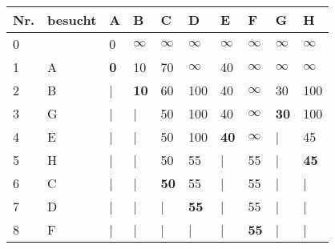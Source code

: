 \documentclass{bschlangaul-aufgabe}
\begin{document}
\begin{enumerate}
\begin{bAntwort}
\begin{tabular}{llllllllll}
\bf{Nr.}     & \bf{besucht} & \bf{A}       & \bf{B}       & \bf{C}       & \bf{D}       & \bf{E}       & \bf{F}       & \bf{G}       & \bf{H}       \\
\hline
0            &              & 0            & $\infty$     & $\infty$     & $\infty$     & $\infty$     & $\infty$     & $\infty$     & $\infty$     \\
1            & A            & \bf{0}       & 10           & 70           & $\infty$     & 40           & $\infty$     & $\infty$     & $\infty$     \\
2            & B            & |            & \bf{10}      & 60           & 100          & 40           & $\infty$     & 30           & 100          \\
3            & G            & |            & |            & 50           & 100          & 40           & $\infty$     & \bf{30}      & 100          \\
4            & E            & |            & |            & 50           & 100          & \bf{40}      & $\infty$     & |            & 45           \\
5            & H            & |            & |            & 50           & 55           & |            & 55           & |            & \bf{45}      \\
6            & C            & |            & |            & \bf{50}      & 55           & |            & 55           & |            & |            \\
7            & D            & |            & |            & |            & \bf{55}      & |            & 55           & |            & |            \\
8            & F            & |            & |            & |            & |            & |            & \bf{55}      & |            & |            \\
\end{tabular}


\end{bAntwort}
\end{enumerate}
\end{document}
